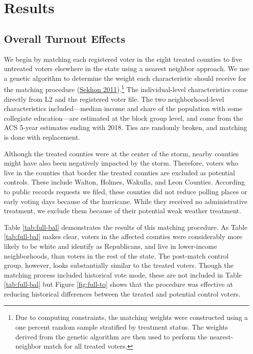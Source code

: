 \documentclass[
  12pt,
]{article}
\begin{document}
\hypertarget{results}{%
\section*{Results}\label{results}}

\hypertarget{overall-turnout-effects}{%
\subsection*{Overall Turnout Effects}\label{overall-turnout-effects}}

We begin by matching each registered voter in the eight treated counties to five untreated voters elsewhere in the state using a nearest neighbor approach. We use a genetic algorithm to determine the weight each characteristic should receive for the matching procedure (\protect\hyperlink{ref-Sekhon2011}{Sekhon 2011}).\footnote{Due to computing constraints, the matching weights were constructed using a one percent random sample stratified by treatment status. The weights derived from the genetic algorithm are then used to perform the nearest-neighbor match for all treated voters.} The individual-level characteristics come directly from L2 and the registered voter file. The two neighborhood-level characteristics included---median income and share of the population with some collegiate education---are estimated at the block group level, and come from the ACS 5-year estimates ending with 2018. Ties are randomly broken, and matching is done with replacement.

Although the treated counties were at the center of the storm, nearby counties might have also been negatively impacted by the storm. Therefore, voters who live in the counties that border the treated counties are excluded as potential controls. These include Walton, Holmes, Wakulla, and Leon Counties. According to public records requests we filed, these counties did not reduce polling places or early voting days because of the hurricane. While they received no administrative treatment, we exclude them because of their potential weak weather treatment.

Table \ref{tab:full-bal} demonstrates the results of this matching procedure. As Table \ref{tab:full-bal} makes clear, voters in the affected counties were considerably more likely to be white and identify as Republicans, and live in lower-income neighborhoods, than voters in the rest of the state. The post-match control group, however, looks substantially similar to the treated voters. Though the matching process included historical vote mode, these are not included in Table \ref{tab:full-bal} but Figure \ref{fig:full-to} shows that the procedure was effective at reducing historical differences between the treated and potential control voters.
\end{document}
